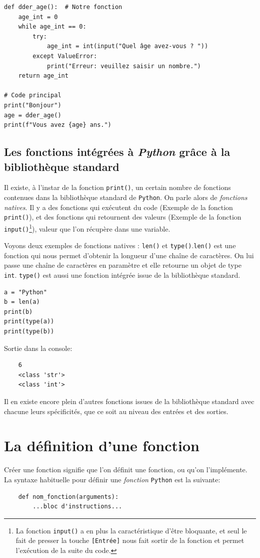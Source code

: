 \documentclass[a4paper,11pt]{book}
\begin{document}
\begin{lstlisting}[caption=Un premier exemple de fonction]
def dder_age():  # Notre fonction
    age_int = 0
    while age_int == 0:
        try:
            age_int = int(input("Quel âge avez-vous ? "))
        except ValueError:
            print("Erreur: veuillez saisir un nombre.")
    return age_int

# Code principal
print("Bonjour")
age = dder_age()
print(f"Vous avez {age} ans.")
\end{lstlisting}
\medskip

\subsection*{Les fonctions intégrées à \textit{Python} grâce à la bibliothèque standard}
Il existe, à l'instar de la fonction \texttt{print()}, un certain nombre de fonctions contenues dans la bibliothèque standard de \texttt{Python}. On parle alors de \textit{fonctions natives}. Il y a des fonctions qui exécutent du code (Exemple de la fonction \texttt{print()}), et des fonctions qui retournent des valeurs (Exemple de la fonction \texttt{input()}\footnote{La fonction \texttt{input()} a en plus la caractéristique d'être bloquante, et seul le fait de presser la touche \texttt{[Entrée]} nous fait sortir de la fonction et permet l'exécution de la suite du code.}), valeur que l'on récupère dans une variable.
\medskip

Voyons deux exemples de fonctions natives : \texttt{len()} et \texttt{type()}.\texttt{len()} est une fonction qui nous permet d'obtenir la longueur d'une chaîne de caractères. On lui passe une chaîne de caractères en paramètre et elle retourne un objet de type \texttt{int}. \texttt{type()} est aussi une fonction intégrée issue de la bibliothèque standard.
\begin{lstlisting}[caption=Les fonctions \texttt{len()} et \texttt{type()}]
a = "Python"
b = len(a)
print(b)
print(type(a))
print(type(b))
\end{lstlisting}
\medskip

Sortie dans la console: 
\begin{verbatim}
    6
    <class 'str'>
    <class 'int'>
\end{verbatim}
\medskip

Il en existe encore plein d'autres fonctions issues de la bibliothèque standard avec chacune leurs spécificités, que ce soit au niveau des entrées et des sorties.
\medskip

\section{La définition d'une fonction}
Créer une fonction signifie que l'on \og définit\fg{} une fonction, ou qu'on l'\og{}implémente\fg{}. La syntaxe habituelle pour définir une \textit{fonction} \texttt{Python} est la suivante:
\begin{verbatim}
    def nom_fonction(arguments):
        ...bloc d'instructions...
\end{verbatim}
\medskip
\end{document}
